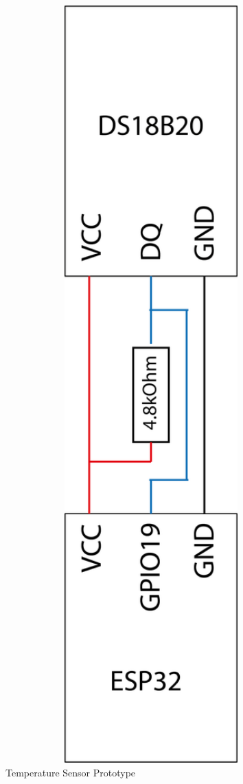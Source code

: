 \begin{figure}
    \centering
    \includegraphics[angle=270,width=1\textwidth]{figures/temperature_wiring.png}
    \caption{Temperature Sensor Prototype}
    \label{fig:temperature_wiring}
\end{figure}

